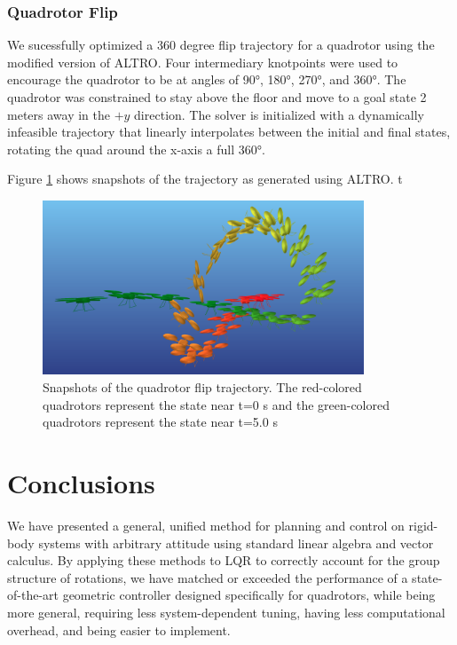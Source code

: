 \documentclass[letterpaper, 10 pt, conference]{ieeeconf}  %
\begin{document}
        \subsubsection{Quadrotor Flip}
        We sucessfully optimized a 360 degree flip trajectory for a quadrotor using the 
        modified version of ALTRO.
	    Four intermediary knotpoints were used to encourage the quadrotor to be at angles
	    of \ang{90}, \ang{180}, \ang{270}, and \ang{360}. The quadrotor was constrained
	    to stay above the floor and move to a goal state 2 meters away in the $+y$
	    direction. The solver is initialized with a dynamically infeasible trajectory
	    that linearly interpolates between the initial and final states, rotating the
	    quad around the x-axis a full \ang{360}.
	    
	    Figure \ref{fig:quad_flip} shows snapshots of the trajectory as generated using
	    ALTRO.  t

            \begin{figure}[t]
                \centering
                \includegraphics[height=5.2cm,trim={0 0cm 0 0},clip]{figures/quadflip.png}
                \caption{Snapshots of the quadrotor flip trajectory. The
                    red-colored quadrotors represent the state near t=0 s and the
                    green-colored quadrotors represent the state near t=5.0 s
                }
                \label{fig:quad_flip}
            \end{figure}    
    

\section{Conclusions} \label{sec:conclusion}
    We have presented a general, unified method for planning and control on rigid-body
    systems with arbitrary attitude using standard linear algebra and vector calculus. By
    applying these methods to LQR to correctly account for the group structure of
    rotations, we have matched or exceeded the performance of a state-of-the-art
    geometric controller designed specifically for quadrotors, while being more general,
    requiring less system-dependent tuning, having less computational overhead, and being
    easier to implement.
    
\end{document}
